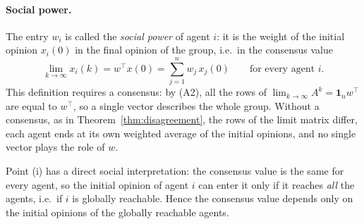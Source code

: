 \paragraph{Social power.}
The entry $w_i$ is called the \emph{social power} of agent $i$: it is the weight of
the initial opinion $x_i(0)$ in the final opinion of the group, i.e.\ in the consensus
value~\cite{proskurnikov2017tutorial}
\begin{equation}\label{eq:social-power}
  \lim_{k \to \infty} x_i(k) = w^\top x(0) = \sum_{j=1}^{n} w_j\, x_j(0)
  \qquad \text{for every agent } i.
\end{equation}
This definition requires a consensus: by (A2), all the rows of
$\lim_{k \to \infty} A^k = \mathbf{1}_n w^\top$ are equal to $w^\top$, so a single vector
describes the whole group. Without a consensus, as in Theorem~\ref{thm:disagreement},
the rows of the limit matrix differ, each agent ends at its own weighted average of the
initial opinions, and no single vector plays the role of $w$.

Point (i) has a direct social interpretation: the consensus value is the same for
every agent, so the initial opinion of agent $i$ can enter it only if it reaches
\emph{all} the agents, i.e.\ if $i$ is globally reachable. Hence the consensus value
depends only on the initial opinions of the globally reachable agents.

